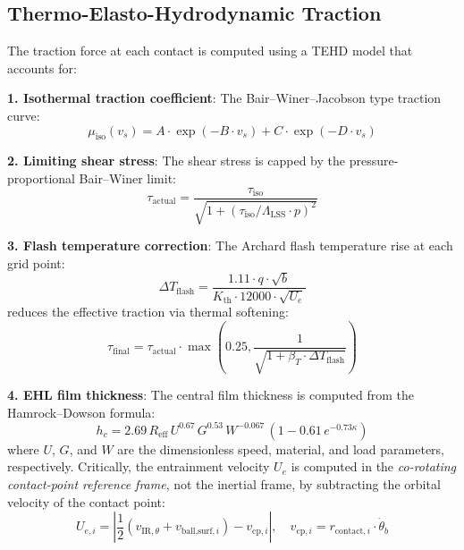 \documentclass[preprint,12pt]{elsarticle}
\begin{document}
\subsection{Thermo-Elasto-Hydrodynamic Traction}
\label{sec:tehd}

The traction force at each contact is computed using a TEHD model that accounts for:

\textbf{1. Isothermal traction coefficient}: The Bair--Winer--Jacobson type traction curve:
\begin{equation}
    \mu_{\text{iso}}(v_s) = A \cdot \exp(-B \cdot v_s) + C \cdot \exp(-D \cdot v_s)
    \label{eq:traction_curve}
\end{equation}

\textbf{2. Limiting shear stress}: The shear stress is capped by the pressure-proportional Bair--Winer limit:
\begin{equation}
    \tau_{\text{actual}} = \frac{\tau_{\text{iso}}}{\sqrt{1 + (\tau_{\text{iso}}/\Lambda_{\text{LSS}} \cdot p)^2}}
    \label{eq:bair_winer}
\end{equation}

\textbf{3. Flash temperature correction}: The Archard flash temperature rise at each grid point:
\begin{equation}
    \Delta T_{\text{flash}} = \frac{1.11 \cdot q \cdot \sqrt{b}}{K_{\text{th}} \cdot 12000 \cdot \sqrt{U_e}}
    \label{eq:flash_temp}
\end{equation}
reduces the effective traction via thermal softening:
\begin{equation}
    \tau_{\text{final}} = \tau_{\text{actual}} \cdot \max\left(0.25, \frac{1}{\sqrt{1 + \beta_T \cdot \Delta T_{\text{flash}}}}\right)
\end{equation}

\textbf{4. EHL film thickness}: The central film thickness is computed from the Hamrock--Dowson formula:
\begin{equation}
    h_c = 2.69 \, R_{\text{eff}} \, U^{0.67} \, G^{0.53} \, W^{-0.067} \, (1 - 0.61\, e^{-0.73 \kappa})
    \label{eq:hd_film}
\end{equation}
where $U$, $G$, and $W$ are the dimensionless speed, material, and load parameters, respectively. Critically, the entrainment velocity $U_e$ is computed in the \emph{co-rotating contact-point reference frame}, not the inertial frame, by subtracting the orbital velocity of the contact point:
\begin{equation}
    U_{e,i} = \left|\frac{1}{2}(v_{\text{IR},\theta} + v_{\text{ball,surf},i}) - v_{\text{cp},i}\right|, \quad
    v_{\text{cp},i} = r_{\text{contact},i} \cdot \dot{\theta}_b
    \label{eq:entrain_corotating}
\end{equation}
\end{document}
